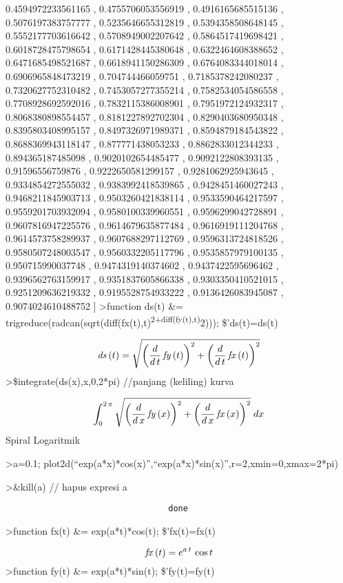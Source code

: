 \documentclass[
]{book}
\begin{document}
0.4594972233561165 ,   0.4755706053556919 , 0.4916165685515136 , 0.5076197383757777 ,   0.5235646655312819 , 0.5394358508648145 , 0.5552177703616642 ,   0.5708949002207642 , 0.5864517419698421 , 0.6018728475798654 ,   0.6171428445380648 , 0.6322464608388652 , 0.6471685498521687 ,   0.6618941150286309 , 0.6764083344018014 , 0.6906965848473219 ,   0.704744466059751 , 0.7185378242080237 , 0.7320627752310482 ,   0.7453057277355214 , 0.7582534054586558 , 0.7708928692592016 ,   0.7832115386008901 , 0.7951972124932317 , 0.8068380898554457 ,   0.8181227892702304 , 0.8290403680950348 , 0.8395803408995157 ,   0.8497326971989371 , 0.8594879184543822 , 0.8688369943118147 ,   0.877771438053233 , 0.8862833012344233 , 0.894365187485098 ,   0.9020102654485477 , 0.9092122808393135 , 0.91596556759876 ,   0.9222650581299157 , 0.9281062925943645 , 0.9334854272555032 ,   0.9383992418539865 , 0.9428451460027243 , 0.9468211845903713 ,   0.9503260421838114 , 0.9533590464217597 , 0.9559201703932094 ,   0.9580100339960551 , 0.9596299042728891 , 0.9607816947225576 ,   0.9614679635877484 , 0.9616919111204768 , 0.9614573758289937 ,   0.9607688297112769 , 0.9596313724818526 , 0.9580507248003547 ,   0.9560332205117796 , 0.9535857979100135 , 0.950715990037748 ,   0.9474319140374602 , 0.9437422595696462 , 0.9396562763159917 ,   0.9351837605866338 , 0.9303350410521015 , 0.9251209636219332 ,   0.9195528754933222 , 0.9136426083945087 , 0.9074024610488752   \right] \]\textgreater function ds(t) \&= trigreduce(radcan(sqrt(diff(fx(t),t)\textsuperscript{2+diff(fy(t),t)}2))); \$'ds(t)=ds(t)

\[{\it ds}\left(t\right)=\sqrt{\left(\frac{d}{d\,t}\,{\it fy}\left(t  \right)\right)^2+\left(\frac{d}{d\,t}\,{\it fx}\left(t\right)\right)  ^2}\]\textgreater\$integrate(ds(x),x,0,2*pi) //panjang (keliling) kurva

\[\int_{0}^{2\,\pi}{\sqrt{\left(\frac{d}{d\,x}\,{\it fy}\left(x  \right)\right)^2+\left(\frac{d}{d\,x}\,{\it fx}\left(x\right)\right)  ^2}\;dx}\]Spiral Logaritmik

\textgreater a=0.1; plot2d(``exp(a*x)*cos(x)'',``exp(a*x)*sin(x)'',r=2,xmin=0,xmax=2*pi)

\textgreater\&kill(a) // hapus expresi a

\begin{verbatim}
                                 done
\end{verbatim}

\textgreater function fx(t) \&= exp(a*t)*cos(t); \$'fx(t)=fx(t)

\[{\it fx}\left(t\right)=e^{a\,t}\,\cos t\]\textgreater function fy(t) \&= exp(a*t)*sin(t); \$'fy(t)=fy(t)
\end{document}
